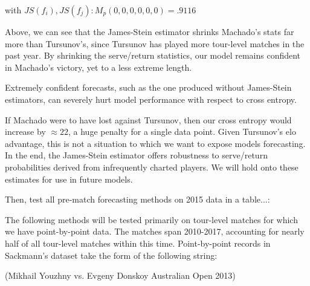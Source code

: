 \documentclass[11pt]{article}
\begin{document}
\begin{enumerate}
with $JS(f_i),JS(f_j): M_p(0,0,0,0,0,0) = .9116$

Above, we can see that the James-Stein estimator shrinks Machado's stats far more than Tursunov's, since Tursunov has played more tour-level matches in the past year. By shrinking the serve/return statistics, our model remains confident in Machado's victory, yet to a less extreme length.

Extremely confident forecasts, such as the one produced without James-Stein estimators, can severely hurt model performance with respect to cross entropy. 




If Machado were to have lost against Tursunov, then our cross entropy would increase by $\approx 22$, a huge penalty for a single data point. Given Tursunov's elo advantage, this is not a situation to which we want to expose models forecasting. In the end, the James-Stein estimator offers robustness to serve/return probabilities derived from infrequently charted players. We will hold onto these estimates for use in future models.




Then, test all pre-match forecasting methods on 2015 data in a table...:

\newpage

The following methods will be tested primarily on tour-level matches for which we have point-by-point data. The matches span 2010-2017, accounting for nearly half of all tour-level matches within this time. Point-by-point records in Sackmann's dataset take the form of the following string:

(Mikhail Youzhny vs. Evgeny Donskoy Australian Open 2013)


\end{enumerate}
\end{document}
